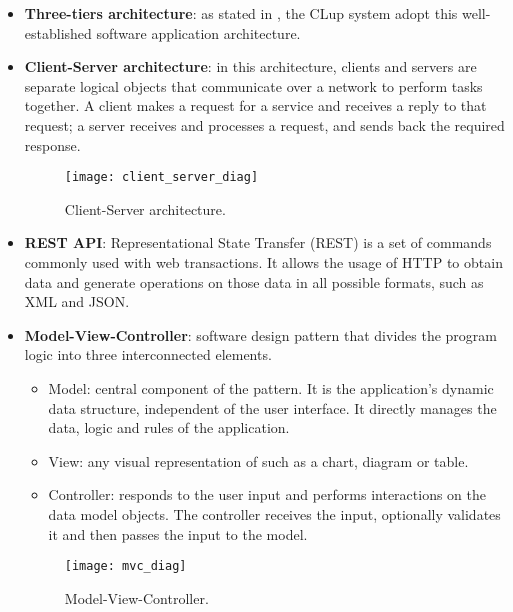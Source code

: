 \begin{itemize}
	\item \textbf{Three-tiers architecture}: as stated in , the CLup system adopt this well-established software application architecture.
	
	\item \textbf{Client-Server architecture}: in this architecture, clients and servers are separate logical objects that communicate over a network to perform tasks together. A client makes a request for a service and receives a reply to that request; a server receives and processes a request, and sends back the required response.
	
	\begin{figure}[H]
		\centering
		\texttt{[image: client\_server\_diag]}
		\caption{Client-Server architecture.}
		\label{fig:client_server_diag}
	\end{figure}
	
	\item \textbf{REST API}: Representational State Transfer (REST) is a set of commands commonly used with web transactions. It allows the usage of HTTP to obtain data and generate operations on those data in all possible formats, such as XML and JSON.
	
	\item \textbf{Model-View-Controller}: software design pattern that divides the program logic into three interconnected elements.
	\begin{itemize}
		\item Model: central component of the pattern. It is the application's dynamic data structure, independent of the user interface. It directly manages the data, logic and rules of the application.
		\item View: any visual representation of  such as a chart, diagram or table.
		\item Controller: responds to the user input and performs interactions on the data model objects. The controller receives the input, optionally validates it and then passes the input to the model.
	\end{itemize}

	\begin{figure}[H]
		\centering
		\texttt{[image: mvc\_diag]}
		\caption{Model-View-Controller.}
		\label{fig:mvc_diag}
	\end{figure}
\end{itemize}

